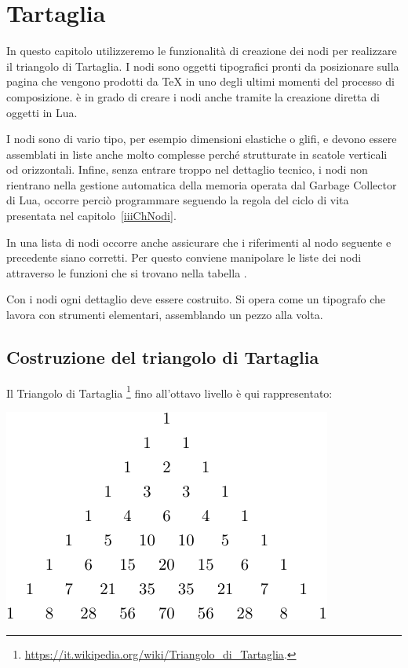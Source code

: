 

\chapter{Tartaglia}
\label{ivChTartaglia}

In questo capitolo utilizzeremo le funzionalità di creazione dei nodi per
realizzare il triangolo di Tartaglia. I nodi sono oggetti tipografici pronti da
posizionare sulla pagina che vengono prodotti da \TeX{} in uno degli ultimi
momenti del processo di composizione. \LuaTeX{} è in grado di creare i nodi
anche tramite la creazione diretta di oggetti in Lua.

I nodi sono di vario tipo, per esempio dimensioni elastiche o glifi, e devono
essere assemblati in liste anche molto complesse perché strutturate in scatole
verticali od orizzontali. Infine, senza entrare troppo nel dettaglio tecnico, i
nodi non rientrano nella gestione automatica della memoria operata dal Garbage
Collector di Lua, occorre perciò programmare seguendo la regola del ciclo di
vita presentata nel capitolo~\ref{iiiChNodi}.

In una lista di nodi occorre anche assicurare che i riferimenti al nodo seguente
e precedente siano corretti. Per questo conviene manipolare le liste dei nodi
attraverso le funzioni che si trovano nella tabella .

Con i nodi ogni dettaglio deve essere costruito. Si opera come un tipografo
che lavora con strumenti elementari, assemblando un pezzo alla volta.


\section{Costruzione del triangolo di Tartaglia}

Il Triangolo di Tartaglia%
\footnote{\url{https://it.wikipedia.org/wiki/Triangolo_di_Tartaglia}.} fino
all'ottavo livello è qui rappresentato:
\begin{center}
\includegraphics{image/tart-triangolo.pdf}
\end{center}

